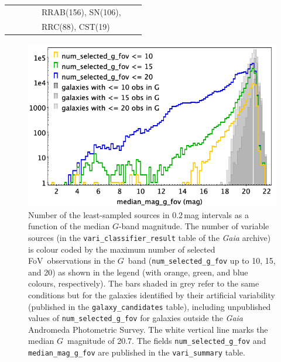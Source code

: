 \documentclass[longauth]{aa}
\def\gaia{\textit{Gaia}\xspace}
\def\g{$G$\xspace}
\begin{document}
\begin{landscape}
\begin{table}
\begin{tabular}{@{}lllrlll@{}}
       &        &                  &             &  RRAB(156),  SN(106), &  &   \\
       &        &                  &             &  RRC(88), CST(19) &  &   \\
\hline                       
\end{tabular}
\end{table}  
\end{landscape}

\begin{figure}[t]
\centering
 \includegraphics[width=\hsize]{figures/least_sampled_hist_0p2bin.png}
 \caption{Number of the least-sampled sources in 0.2\,mag intervals as a function of the median \g-band magnitude. The number of variable sources (in the \texttt{vari\_classifier\_result} table of the \gaia archive) is colour coded by the maximum number of selected FoV~observations in the \g~band (\texttt{num\_selected\_g\_fov} up to 10, 15, and 20) as shown in the legend (with orange, green, and blue colours, respectively). The bars shaded in grey refer to the same conditions but for the galaxies identified by their artificial variability (published in the \texttt{galaxy\_candidates} table), including unpublished values of \texttt{num\_selected\_g\_fov} for galaxies outside the \gaia Andromeda Photometric Survey. The white vertical line marks the median \g~magnitude of 20.7. The fields \texttt{num\_selected\_g\_fov} and \texttt{median\_mag\_g\_fov} are published in the \texttt{vari\_summary} table.}
 \label{fig:leastsampled_histo}
\end{figure}
\end{document}
